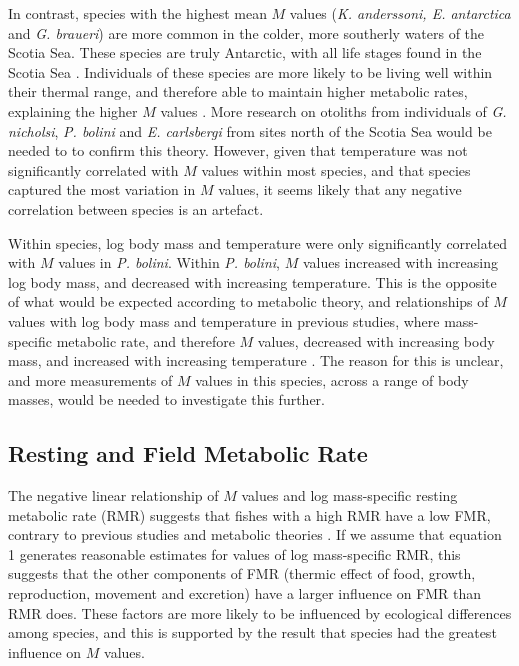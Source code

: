 \documentclass[12pt, titlepage]{article}
\begin{document}
In contrast, species with the highest mean $M$ values (\textit{K. anderssoni, E. antarctica} and \textit{G. braueri}) are more common in the colder, more southerly waters of the Scotia Sea.
These species are truly Antarctic, with all life stages found in the Scotia Sea \citep{Saunders2014, GonHeemstra, Saunders2015a, Lourenco2017, Collins2012, Collins2008}.
Individuals of these species are more likely to be living well within their thermal range, and therefore able to maintain higher metabolic rates, explaining the higher $M$ values  \citep{Clarke1999, Killen2010, Portner2008}.
More research on otoliths from individuals of \textit{G. nicholsi}, \textit{P. bolini} and \textit{E. carlsbergi} from sites north of the Scotia Sea would be needed to to confirm this theory. 
However, given that temperature was not significantly correlated with $M$ values within most species, and that species captured the most variation in $M$ values, it seems likely that any negative correlation between species is an artefact.

Within species, log body mass and temperature were only significantly correlated with $M$ values in \textit{P. bolini}.
Within \textit{P. bolini}, $M$ values increased with increasing log body mass, and decreased with increasing temperature.
This is the opposite of what would be expected according to metabolic theory, and relationships of $M$ values with log body mass and temperature in previous studies, where mass-specific metabolic rate, and therefore $M$ values, decreased with increasing body mass, and increased with increasing temperature \citep{Portner2008, Killen2010, Clarke1999, Brown2004, Trueman2016}.
The reason for this is unclear, and more measurements of $M$ values in this species, across a range of body masses, would be needed to investigate this further.

\subsection {Resting and Field Metabolic Rate}

The negative linear relationship of $M$ values and log mass-specific resting metabolic rate (RMR) suggests that fishes with a high RMR have a low FMR, contrary to previous studies and metabolic theories \citep{Brown2004, Killen2016}.
If we assume that equation 1 generates reasonable estimates for values of log mass-specific RMR, this suggests that the other components of FMR (thermic effect of food, growth, reproduction, movement and excretion) have a larger influence on FMR than RMR does.
These factors are more likely to be influenced by ecological differences among species, and this is supported by the result that species had the greatest influence on $M$ values.
\end{document}
